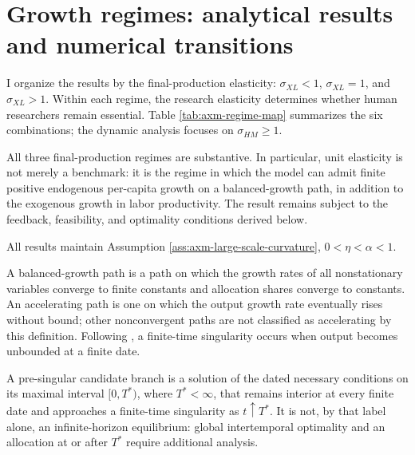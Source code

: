 \section{Growth regimes: analytical results and numerical transitions}
\label{sec:axm-growth-regimes}

I organize the results by the final-production elasticity:
\(\sigma_{XL}<1\), \(\sigma_{XL}=1\), and \(\sigma_{XL}>1\). Within each
regime, the research elasticity determines whether human researchers remain
essential. Table \ref{tab:axm-regime-map} summarizes the six combinations; the
dynamic analysis focuses on \(\sigma_{HM}\geq1\).

All three final-production regimes are substantive. In particular, unit
elasticity is not merely a benchmark: it is the regime in which the model can
admit finite positive endogenous per-capita growth on a balanced-growth path,
in addition to the exogenous growth in labor productivity. The result remains
subject to the feedback, feasibility, and optimality conditions derived below.

All results maintain Assumption \ref{ass:axm-large-scale-curvature},
\(0<\eta<\alpha<1\).

\begin{definition}
A balanced-growth path is a path on which the growth rates of all nonstationary
variables converge to finite constants and allocation shares converge to
constants. An accelerating path is one on which the output growth rate
eventually rises without bound; other nonconvergent paths are not classified as
accelerating by this definition. Following \citet{aghionjonesjones2019}, a
finite-time singularity occurs when output becomes unbounded at a finite date.
\end{definition}

\begin{definition}
A pre-singular candidate branch is a solution of the dated necessary conditions
on its maximal interval \([0,T^*)\), where \(T^*<\infty\), that remains
interior at every finite date and approaches a finite-time singularity as
\(t\uparrow T^*\). It is not, by that label alone, an infinite-horizon
equilibrium: global intertemporal optimality and an allocation at or after
\(T^*\) require additional analysis.
\end{definition}

